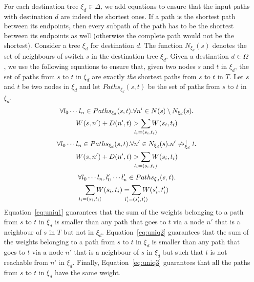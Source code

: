 For each destination tree $\xi_d\in\Delta$, we add equations to ensure 
that the input paths with destination $d$ are indeed the shortest ones.
 If a path
is the shortest path between its endpoints, then every 
subpath of the path has to be the shortest between its endpoints
as well (otherwise the complete path would not be the shortest).
Consider a tree $\xi_d$ for destination $d$. 
The function $N_{\xi_d}(s)$ denotes the set of
neighbours of switch $s$ in the destination tree $\xi_d$. 
Given a destination $d\in \Omega$,
we use the following equations to ensure that, given two nodes $s$ and $t$ in
$\xi_d$, 
the set of paths from $s$ to $t$ in $\xi_d$ are
exactly
\emph{the} shortest paths from $s$ to $t$ in $T$.
Let $s$ and $t$ be two nodes in $\xi_d$ and let  $Paths_{\xi_d}(s,t)$ be the set of paths from $s$ to $t$ in $\xi_d$.
\begin{multline} \label{eq:uniq1}
		\forall l_0\cdots l_n\in Paths_{\xi_d}(s,t).
		\forall n' \in N(s) \setminus N_{\xi_d}(s). \\
		W(s, n') + D(n', t) > \sum_{\mathclap{\substack{l_i=(s_i,t_i)}}} 
		W(s_i, t_i) 
\end{multline}
\begin{multline} \label{eq:uniq2}
		\forall l_0\cdots l_n\in Paths_{\xi_d}(s,t).
		\forall n' \in N_{\xi_d}(s). n' \not\rightarrow^+_{\xi_d} t.  \\
		W(s, n') + D(n', t) > \sum_{\mathclap{\substack{l_i=(s_i,t_i)}}} 
		W(s_i, t_i) 
\end{multline}
\vspace{-2mm}
\begin{multline} \label{eq:uniq3}
		\forall l_0\cdots l_n, l_0'\cdots l_n'\in Paths_{\xi_d}(s,t).\\
		\sum_{\mathclap{\substack{l_i=(s_i,t_i)}}} 
		W(s_i, t_i)  =\sum_{\mathclap{\substack{l_i'=(s_i',t_i')}}} 
		W(s_i', t_i') 
\end{multline}
Equation~\ref{eq:uniq1} guarantees that 
the sum of the weights belonging to a path from $s$ to $t$ in $\xi_d$ is smaller than 
any path that goes to $t$ via a node $n'$ that is a neighbour of $s$ in $T$ but not in $\xi_d$.
Equation~\ref{eq:uniq2} guarantees that
the sum of the weights belonging to a path from $s$ to $t$ in $\xi_d$ is smaller than 
any path that goes to $t$ via a node $n'$ that is a neighbour of $s$ in $\xi_d$ but such that
$t$ is not reachable from $n'$ in $\xi_d$.
Finally, Equation~\ref{eq:uniq3} guarantees that all the paths from $s$ to $t$ in $\xi_d$ have the same weight.


